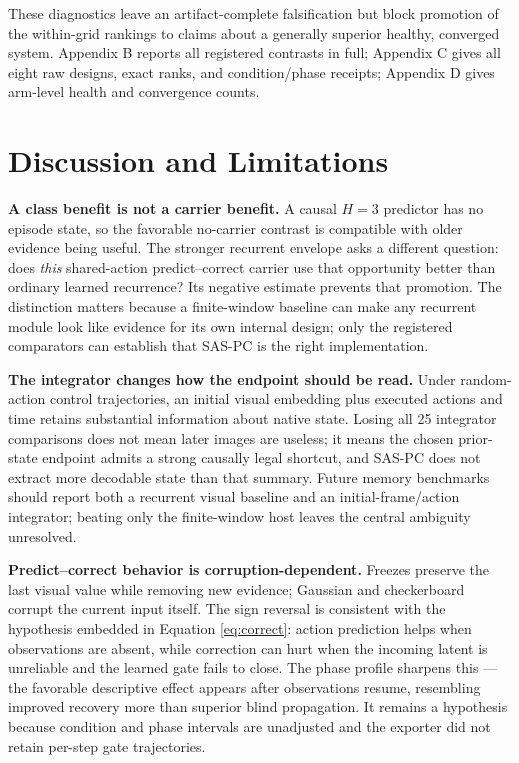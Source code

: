 These diagnostics leave an artifact-complete falsification but block
promotion of the within-grid rankings to claims about a generally
superior healthy, converged system. Appendix B reports all registered
contrasts in full; Appendix C gives all eight raw designs, exact ranks,
and condition/phase receipts; Appendix D gives arm-level health and
convergence counts.

\section{Discussion and Limitations}\label{discussion-and-limitations}

\textbf{A class benefit is not a carrier benefit.} A causal
\(H=3\) predictor has no episode state, so the favorable
no-carrier contrast is compatible with older evidence being useful. The
stronger recurrent envelope asks a different question: does \emph{this}
shared-action predict--correct carrier use that opportunity better than
ordinary learned recurrence? Its negative estimate prevents that
promotion. The distinction matters because a finite-window baseline can
make any recurrent module look like evidence for its own internal
design; only the registered comparators can establish that SAS-PC is the
right implementation.

\textbf{The integrator changes how the endpoint should be read.} Under
random-action control trajectories, an initial visual embedding plus
executed actions and time retains substantial information about native
state. Losing all 25 integrator comparisons does not mean later images
are useless; it means the chosen prior-state endpoint admits a strong
causally legal shortcut, and SAS-PC does not extract more decodable
state than that summary. Future memory benchmarks should report both a
recurrent visual baseline and an initial-frame/action integrator;
beating only the finite-window host leaves the central ambiguity
unresolved.

\textbf{Predict--correct behavior is corruption-dependent.} Freezes
preserve the last visual value while removing new evidence; Gaussian and
checkerboard corrupt the current input itself. The sign reversal is
consistent with the hypothesis embedded in Equation \ref{eq:correct}:
action prediction helps when observations are absent, while correction
can hurt when the incoming latent is unreliable and the learned gate
fails to close. The phase profile sharpens this --- the favorable
descriptive effect appears after observations resume, resembling
improved recovery more than superior blind propagation. It remains a
hypothesis because condition and phase intervals are unadjusted and the
exporter did not retain per-step gate trajectories.

